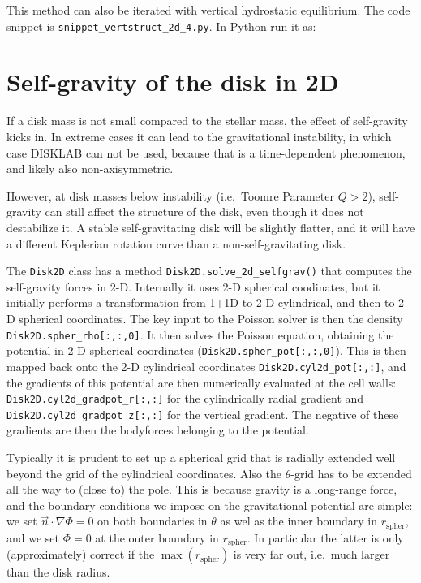 \documentclass{book}
\newcommand{\code}[1]{{\small\tt #1}}
\begin{document}
This method can also be iterated with vertical hydrostatic equilibrium.
The code snippet is
\code{snippet\_vertstruct\_2d\_4.py}. In Python run it as:
\begin{codebox}
\end{codebox}


\section{Self-gravity of the disk in 2D}
\label{sec-selfgravity-2d}
If a disk mass is not small compared to the stellar mass, the effect of self-gravity
kicks in. In extreme cases it can lead to the gravitational instability, in which
case {\sf DISKLAB} can not be used, because that is a time-dependent phenomenon,
and likely also non-axisymmetric.

However, at disk masses below instability (i.e.\ Toomre Parameter $Q>2$),
self-gravity can still affect the structure of the disk, even though it does not
destabilize it.  A stable self-gravitating disk will be slightly flatter, and it
will have a different Keplerian rotation curve than a non-self-gravitating disk.

The \code{Disk2D} class has a method \code{Disk2D.solve\_2d\_selfgrav()} that
computes the self-gravity forces in 2-D.  Internally it uses 2-D spherical
coodinates, but it initially performs a transformation from 1+1D to 2-D
cylindrical, and then to 2-D spherical coordinates.  The key input to the
Poisson solver is then the density \code{Disk2D.spher\_rho[:,:,0]}. It then
solves the Poisson equation, obtaining the potential in 2-D spherical
coordinates (\code{Disk2D.spher\_pot[:,:,0]}). This is then mapped back
onto the 2-D cylindrical coordinates \code{Disk2D.cyl2d\_pot[:,:]}, and
the gradients of this potential are then numerically evaluated at the
cell walls: \code{Disk2D.cyl2d\_gradpot\_r[:,:]} for the cylindrically
radial gradient and \code{Disk2D.cyl2d\_gradpot\_z[:,:]} for the vertical
gradient. The negative of these gradients are then the bodyforces belonging
to the potential.

Typically it is prudent to set up a spherical grid that is radially extended
well beyond the grid of the cylindrical coordinates. Also the $\theta$-grid has
to be extended all the way to (close to) the pole.  This is because gravity is a
long-range force, and the boundary conditions we impose on the gravitational
potential are simple: we set $\vec n\cdot \nabla \Phi=0$ on both boundaries in
$\theta$ as wel as the inner boundary in $r_{\mathrm{spher}}$, and we set
$\Phi=0$ at the outer boundary in $r_{\mathrm{spher}}$. In particular the latter
is only (approximately) correct if the $\max(r_{\mathrm{spher}})$ is very far
out, i.e.\ much larger than the disk radius.
\end{document}
